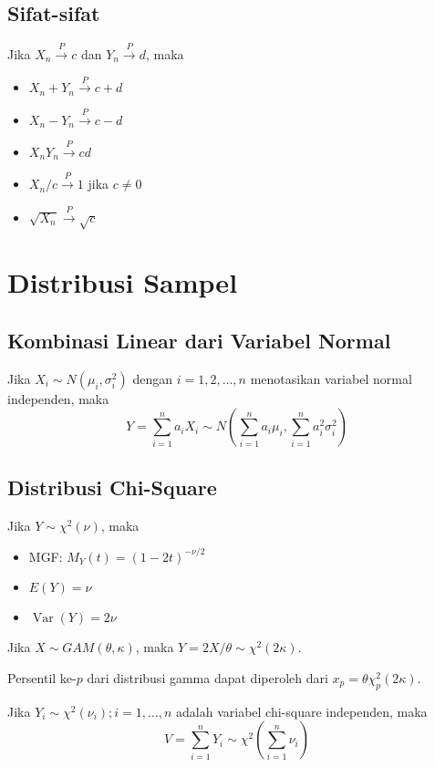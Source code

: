\documentclass[a4paper,extrafontsizes, 9pt]{memoir}
\DeclareMathOperator{\Var}{Var}
\begin{document}
\begin{multicols}{3}
                \subsection*{\small Sifat-sifat}
                Jika $X_n\xrightarrow{P}c$ dan $Y_n\xrightarrow{P}d$, maka
                \begin{itemize}
                    \setlength\itemsep{0.5mm}
                    \item $X_n+Y_n\xrightarrow{P}c+d$
                    \item $X_n-Y_n\xrightarrow{P}c-d$
                    \item $X_nY_n\xrightarrow{P}cd$
                    \item $X_n/c\xrightarrow{P}1$ jika $c\neq 0$
                    \item $\sqrt{X_n}\xrightarrow{P}\sqrt{c}$
                \end{itemize}
            \section*{\small Distribusi Sampel}
            \subsection*{\small Kombinasi Linear dari Variabel Normal}
                Jika $X_i\sim N(\mu_i,\sigma_i^2)$ dengan $i=1,2,\dots,n$ menotasikan variabel normal independen, maka
                \[Y=\sum_{i=1}^{n}a_iX_i\sim N\left(\sum_{i=1}^{n}a_i\mu_i,\sum_{i=1}^{n}a_i^2\sigma_i^2\right)\]
            \subsection*{\small Distribusi Chi-Square}
                Jika $Y\sim\chi^2(\nu)$, maka
                \begin{itemize}
                    \item MGF: $M_Y(t)=(1-2t)^{-\nu/2}$
                    \item $E(Y)=\nu$
                    \item $\Var(Y)=2\nu$
                \end{itemize}
                Jika $X\sim GAM(\theta,\kappa)$, maka $Y=2X/\theta \sim\chi^2(2\kappa)$.

                Persentil ke-$p$ dari distribusi gamma dapat diperoleh dari $x_p=\theta\chi^2_p(2\kappa)$.

                Jika $Y_i\sim\chi^2(\nu_i);i=1,\dots,n$ adalah variabel chi-square independen, maka
                \[V=\sum_{i=1}^{n}Y_i\sim\chi^2\left(\sum_{i=1}^{n}\nu_i\right)\]


\end{multicols}
\end{document}
